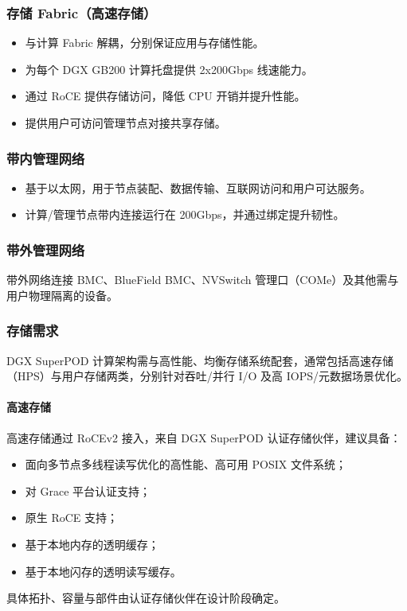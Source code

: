\documentclass[10pt]{article}
\begin{document}
\subsubsection{存储 Fabric（高速存储）}
\begin{itemize}
\item 与计算 Fabric 解耦，分别保证应用与存储性能。
\item 为每个 DGX GB200 计算托盘提供 2x200Gbps 线速能力。
\item 通过 RoCE 提供存储访问，降低 CPU 开销并提升性能。
\item 提供用户可访问管理节点对接共享存储。
\end{itemize}

\subsubsection{带内管理网络}
\begin{itemize}
\item 基于以太网，用于节点装配、数据传输、互联网访问和用户可达服务。
\item 计算/管理节点带内连接运行在 200Gbps，并通过绑定提升韧性。
\end{itemize}

\subsubsection{带外管理网络}
带外网络连接 BMC、BlueField BMC、NVSwitch 管理口（COMe）及其他需与用户物理隔离的设备。

\subsubsection{存储需求}
DGX SuperPOD 计算架构需与高性能、均衡存储系统配套，通常包括高速存储（HPS）与用户存储两类，分别针对吞吐/并行 I/O 及高 IOPS/元数据场景优化。

\paragraph{高速存储}
高速存储通过 RoCEv2 接入，来自 DGX SuperPOD 认证存储伙伴，建议具备：
\begin{itemize}
\item 面向多节点多线程读写优化的高性能、高可用 POSIX 文件系统；
\item 对 Grace 平台认证支持；
\item 原生 RoCE 支持；
\item 基于本地内存的透明缓存；
\item 基于本地闪存的透明读写缓存。
\end{itemize}
具体拓扑、容量与部件由认证存储伙伴在设计阶段确定。
\end{document}
